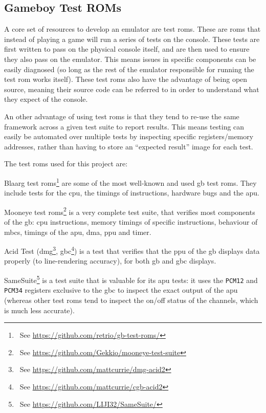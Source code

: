 \documentclass[11pt]{informatics-report}
\newcommand{\ftnt}[1]{\footnote{~See \url{#1}}}
\begin{document}
\subsection{Gameboy Test ROMs}
\label{sec:gb-test-roms}

A core set of resources to develop an emulator are test \glspl{rom}. These are \glspl{rom} that instead of playing a game will run a series of tests on the console. These tests are first written to pass on the physical console itself, and are then used to ensure they also pass on the emulator. This means issues in specific components can be easily diagnosed (so long as the rest of the emulator responsible for running the test \gls{rom} works itself). These test \glspl{rom} also have the advantage of being open source, meaning their source code can be referred to in order to understand what they expect of the console.

An other advantage of using test \glspl{rom} is that they tend to re-use the same framework across a given test suite to report results. This means testing can easily be automated over multiple tests by inspecting specific registers/memory addresses, rather than having to store an ``expected result'' image for each test.

The test \glspl{rom} used for this project are:

\begin{compactitem}
    \item Blaarg test \glspl{rom}\ftnt{https://github.com/retrio/gb-test-roms/} are some of the most well-known and used \gls{gb} test \glspl{rom}. They include tests for the \gls{cpu}, the timings of instructions, hardware bugs and the \gls{apu}.
    \item Mooneye test \glspl{rom}\ftnt{https://github.com/Gekkio/mooneye-test-suite} is a very complete test suite, that verifies most components of the \gls{gb}: \gls{cpu} instructions, memory timings of specific instructions, behaviour of \glspl{mbc}, timings of the \gls{apu}, \gls{dma}, \gls{ppu} and timer.
    \item Acid Test (\gls{dmg}\ftnt{https://github.com/mattcurrie/dmg-acid2}, \gls{gbc}\ftnt{https://github.com/mattcurrie/cgb-acid2}) is a test that verifies that the \gls{ppu} of the \gls{gb} displays data properly (to line-rendering accuracy), for both \glsdesc{gb} and \glsdesc{gbc} displays.
    \item SameSuite\ftnt{https://github.com/LIJI32/SameSuite/} is a test suite that is valuable for its \gls{apu} tests: it uses the \texttt{PCM12} and \texttt{PCM34} registers exclusive to the \gls{gbc} to inspect the exact output of the \gls{apu} (whereas other test \glspl{rom} tend to inspect the on/off status of the channels, which is much less accurate).
\end{compactitem}
\end{document}
